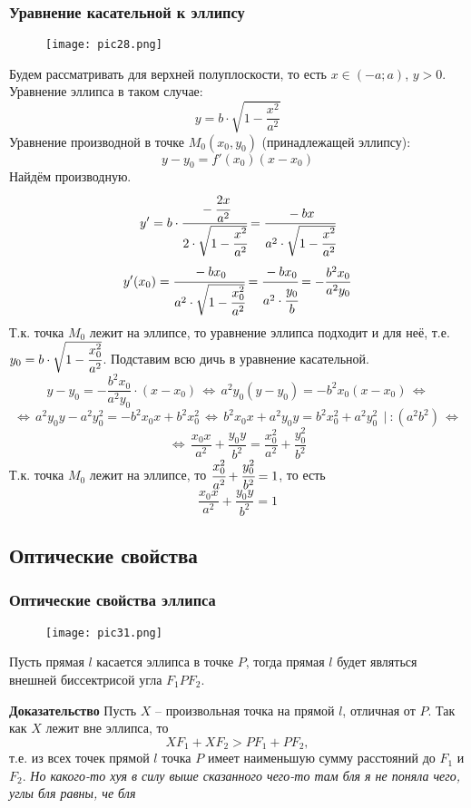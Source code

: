 \documentclass{article}
\begin{document}
\subsubsection{Уравнение касательной к эллипсу}
\begin{wrapfigure}{l}{0.5\textwidth}
    \centering
    \texttt{[image: pic28.png]}
\end{wrapfigure}
Будем рассматривать для верхней полуплоскости, то есть $x\in(-a;a)$, $y>0$. Уравнение эллипса в таком случае:
$$ y=b\cdot\sqrt{1-\frac{x^2}{a^2}} $$
Уравнение производной в точке $M_0(x_0,y_0)$ (принадлежащей эллипсу):
$$ y-y_0=f'(x_0)(x-x_0) $$
Найдём производную.
$$ y'=b\cdot\cfrac{-\cfrac{2x}{a^2}}{2\cdot\sqrt{1-\cfrac{x^2}{a^2}}}=\cfrac{-bx}{a^2\cdot\sqrt{1-\cfrac{x^2}{a^2}}} $$
$$ y'(x_0)=\cfrac{-bx_0}{a^2\cdot\sqrt{1-\cfrac{x_0^2}{a^2}}}=\cfrac{-bx_0}{a^2\cdot\cfrac{y_0}{b}}=-\frac{b^2x_0}{a^2y_0} $$
Т.к. точка $M_0$ лежит на эллипсе, то уравнение эллипса подходит и для неё, т.е. $y_0=b\cdot\sqrt{1-\cfrac{x_0^2}{a^2}}$. Подставим всю дичь в уравнение касательной.
\newpage
$$ y-y_0=-\frac{b^2x_0}{a^2y_0}\cdot(x-x_0)\,\Leftrightarrow\,a^2y_0(y-y_0)=-b^2x_0(x-x_0)\,\Leftrightarrow $$
$$ \Leftrightarrow\,a^2y_0y-a^2y_0^2=-b^2x_0x+b^2x_0^2\,\Leftrightarrow\,b^2x_0x+a^2y_0y=b^2x_0^2+a^2y_0^2\:\:|\::(a^2b^2)\,\Leftrightarrow$$
$$ \Leftrightarrow\,\frac{x_0x}{a^2}+\frac{y_0y}{b^2}=\frac{x_0^2}{a^2}+\frac{y_0^2}{b^2} $$
Т.к. точка $M_0$ лежит на эллипсе, то $\cfrac{x_0^2}{a^2}+\cfrac{y_0^2}{b^2}=1$, то есть
$$ \frac{x_0x}{a^2}+\frac{y_0y}{b^2}=1 $$

\subsection{Оптические свойства}
\subsubsection{Оптические свойства эллипса}
\begin{wrapfigure}{l}{0.5\textwidth}
    \centering
    \texttt{[image: pic31.png]}
\end{wrapfigure}
Пусть прямая $l$ касается эллипса в точке $P$, тогда прямая $l$ будет являться внешней биссектрисой угла $F_1PF_2$.

\textbf{Доказательство}
Пусть $X$ -- произвольная точка на прямой $l$, отличная от $P$. Так как $X$ лежит вне эллипса, то
$$ XF_1+XF_2>PF_1+PF_2, $$
т.е. из всех точек прямой $l$ точка $P$ имеет наименьшую сумму расстояний до $F_1$ и $F_2$. \textit{Но какого-то хуя в силу выше сказанного чего-то там бля я не поняла чего, углы бля равны, че бля}
\end{document}
